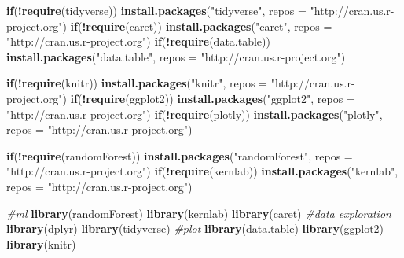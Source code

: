 \documentclass[]{article}
\newenvironment{Shaded}{\begin{snugshade}}{\end{snugshade}}
\newcommand{\CommentTok}[1]{\textcolor[rgb]{0.56,0.35,0.01}{\textit{#1}}}
\newcommand{\ControlFlowTok}[1]{\textcolor[rgb]{0.13,0.29,0.53}{\textbf{#1}}}
\newcommand{\DataTypeTok}[1]{\textcolor[rgb]{0.13,0.29,0.53}{#1}}
\newcommand{\KeywordTok}[1]{\textcolor[rgb]{0.13,0.29,0.53}{\textbf{#1}}}
\newcommand{\NormalTok}[1]{#1}
\newcommand{\OperatorTok}[1]{\textcolor[rgb]{0.81,0.36,0.00}{\textbf{#1}}}
\newcommand{\StringTok}[1]{\textcolor[rgb]{0.31,0.60,0.02}{#1}}
\begin{document}
\begin{Shaded}
\begin{Highlighting}[]
\ControlFlowTok{if}\NormalTok{(}\OperatorTok{!}\KeywordTok{require}\NormalTok{(tidyverse)) }\KeywordTok{install.packages}\NormalTok{(}\StringTok{"tidyverse"}\NormalTok{, }\DataTypeTok{repos =} \StringTok{"http://cran.us.r-project.org"}\NormalTok{)}
\ControlFlowTok{if}\NormalTok{(}\OperatorTok{!}\KeywordTok{require}\NormalTok{(caret)) }\KeywordTok{install.packages}\NormalTok{(}\StringTok{"caret"}\NormalTok{, }\DataTypeTok{repos =} \StringTok{"http://cran.us.r-project.org"}\NormalTok{)}
\ControlFlowTok{if}\NormalTok{(}\OperatorTok{!}\KeywordTok{require}\NormalTok{(data.table)) }\KeywordTok{install.packages}\NormalTok{(}\StringTok{"data.table"}\NormalTok{, }\DataTypeTok{repos =} \StringTok{"http://cran.us.r-project.org"}\NormalTok{)}

\ControlFlowTok{if}\NormalTok{(}\OperatorTok{!}\KeywordTok{require}\NormalTok{(knitr)) }\KeywordTok{install.packages}\NormalTok{(}\StringTok{"knitr"}\NormalTok{, }\DataTypeTok{repos =} \StringTok{"http://cran.us.r-project.org"}\NormalTok{)}
\ControlFlowTok{if}\NormalTok{(}\OperatorTok{!}\KeywordTok{require}\NormalTok{(ggplot2)) }\KeywordTok{install.packages}\NormalTok{(}\StringTok{"ggplot2"}\NormalTok{, }\DataTypeTok{repos =} \StringTok{"http://cran.us.r-project.org"}\NormalTok{)}
\ControlFlowTok{if}\NormalTok{(}\OperatorTok{!}\KeywordTok{require}\NormalTok{(plotly)) }\KeywordTok{install.packages}\NormalTok{(}\StringTok{"plotly"}\NormalTok{, }\DataTypeTok{repos =} \StringTok{"http://cran.us.r-project.org"}\NormalTok{)}

\ControlFlowTok{if}\NormalTok{(}\OperatorTok{!}\KeywordTok{require}\NormalTok{(randomForest)) }\KeywordTok{install.packages}\NormalTok{(}\StringTok{"randomForest"}\NormalTok{, }\DataTypeTok{repos =} \StringTok{"http://cran.us.r-project.org"}\NormalTok{)}
\ControlFlowTok{if}\NormalTok{(}\OperatorTok{!}\KeywordTok{require}\NormalTok{(kernlab)) }\KeywordTok{install.packages}\NormalTok{(}\StringTok{"kernlab"}\NormalTok{, }\DataTypeTok{repos =} \StringTok{"http://cran.us.r-project.org"}\NormalTok{)}
\end{Highlighting}
\end{Shaded}

\begin{Shaded}
\begin{Highlighting}[]
\CommentTok{#ml}
\KeywordTok{library}\NormalTok{(randomForest)}
\KeywordTok{library}\NormalTok{(kernlab)}
\KeywordTok{library}\NormalTok{(caret)}
\CommentTok{#data exploration}
\KeywordTok{library}\NormalTok{(dplyr)}
\KeywordTok{library}\NormalTok{(tidyverse) }
\CommentTok{#plot}
\KeywordTok{library}\NormalTok{(data.table)}
\KeywordTok{library}\NormalTok{(ggplot2)}
\KeywordTok{library}\NormalTok{(knitr)}
\end{Highlighting}
\end{Shaded}
\end{document}
